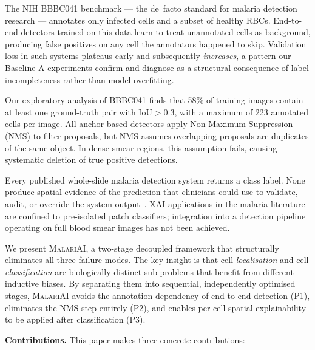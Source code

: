 \documentclass[10pt,twocolumn]{article}
\newcommand{\malariai}{\textsc{MalariAI}}
\begin{document}
\begin{description}[leftmargin=2em]
  \item[\textbf{P1 --- Incomplete Annotation.}] The NIH BBBC041 benchmark
  --- the de~facto standard for malaria detection research --- annotates
  only infected cells and a subset of healthy RBCs. End-to-end detectors
  trained on this data learn to treat unannotated cells as background,
  producing false positives on any cell the annotators happened to skip.
  Validation loss in such systems plateaus early and subsequently
  \emph{increases}, a pattern our Baseline A experiments confirm and
  diagnose as a structural consequence of label incompleteness rather than
  model overfitting.

  \item[\textbf{P2 --- Dense Overlap and NMS Failure.}] Our exploratory
  analysis of BBBC041 finds that 58\% of training images contain at least
  one ground-truth pair with $\text{IoU} > 0.3$, with a maximum of 223
  annotated cells per image. All anchor-based detectors apply Non-Maximum
  Suppression (NMS) to filter proposals, but NMS assumes overlapping
  proposals are duplicates of the same object. In dense smear regions, this
  assumption fails, causing systematic deletion of true positive detections.

  \item[\textbf{P3 --- Black-Box Output.}] Every published whole-slide
  malaria detection system returns a class label. None produce spatial
  evidence of the prediction that clinicians could use to validate,
  audit, or override the system output~\cite{selvaraju2017,chattopadhyay2018}.
  XAI applications in the malaria literature are confined to pre-isolated
  patch classifiers; integration into a detection pipeline operating on
  full blood smear images has not been achieved.
\end{description}

We present \malariai{}, a two-stage decoupled framework that structurally
eliminates all three failure modes. The key insight is that cell
\emph{localisation} and cell \emph{classification} are biologically
distinct sub-problems that benefit from different inductive biases.
By separating them into sequential, independently optimised stages,
\malariai{} avoids the annotation dependency of end-to-end detection
(P1), eliminates the NMS step entirely (P2), and enables per-cell
spatial explainability to be applied after classification (P3).

\medskip
\noindent\textbf{Contributions.} This paper makes three concrete contributions:
\end{document}
